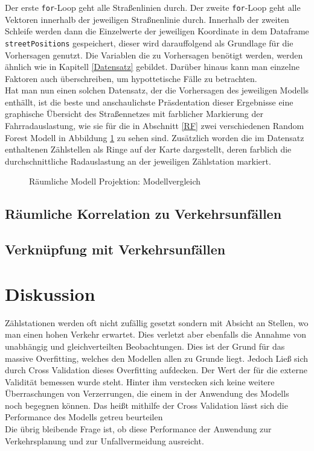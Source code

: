 \documentclass[a4paper,12pt]{thesis}
\begin{document}
Der erste \lstinline|for|-Loop geht alle Straßenlinien durch. Der zweite \lstinline|for|-Loop geht alle Vektoren innerhalb der jeweiligen Straßnenlinie durch. Innerhalb der zweiten Schleife werden dann die Einzelwerte der jeweiligen Koordinate in dem Dataframe \lstinline|streetPositions| gespeichert, dieser wird darauffolgend als Grundlage für die Vorhersagen genutzt. Die Variablen die zu Vorhersagen benötigt werden, werden ähnlich wie in Kapitell \ref{Datensatz} gebildet. Darüber hinaus kann man einzelne Faktoren auch überschreiben, um hypottetische Fälle zu betrachten.\\
Hat man nun einen solchen Datensatz, der die Vorhersagen des jeweiligen Modells enthällt, ist die beste und anschaulichste Präsdentation dieser Ergebnisse eine graphische Übersicht des Straßennetzes mit farblicher Markierung der Fahrradauslastung, wie sie für die in Abschnitt \ref{RF} zwei verschiedenen Random Forest Modell in Abbildung \ref{fig:MunsterRing} zu sehen sind. Zusätzlich worden die im Datensatz enthaltenen Zählstellen als Ringe auf der Karte dargestellt, deren farblich die durchschnittliche Radauslastung an der jeweiligen Zählstation markiert.

\begin{figure}%
	\centering

	\caption{Räumliche Modell Projektion: Modellvergleich}%
	\label{fig:MunsterRing}%
\end{figure}

\section{Räumliche Korrelation zu Verkehrsunfällen}

\section{Verknüpfung mit Verkehrsunfällen}

\chapter{Diskussion}

Zählstationen werden oft nicht zufällig gesetzt sondern mit Absicht an Stellen, wo man einen hohen Verkehr erwartet. Dies verletzt aber ebenfalls die Annahme von unabhängig und gleichverteilten Beobachtungen. Dies ist der Grund für das massive Overfitting, welches den Modellen allen zu Grunde liegt. Jedoch Ließ sich durch Cross Validation dieses Overfitting aufdecken. Der Wert der für die externe Validität bemessen wurde steht. Hinter ihm verstecken sich keine weitere Überraschungen von Verzerrungen, die einem in der Anwendung des Modells noch begegnen können. Das heißt mithilfe der Cross Validation lässt sich die Performance des Modells getreu beurteilen\\
Die übrig bleibende Frage ist, ob diese Performance der Anwendung zur Verkehrsplanung und zur Unfallvermeidung ausreicht.
\end{document}

